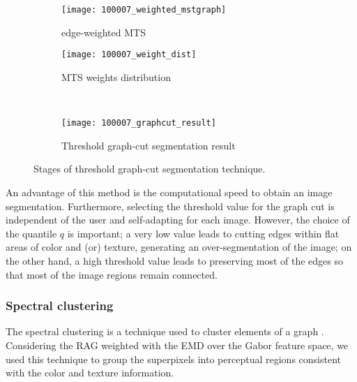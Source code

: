 \begin{figure}[!ht]
    \centering
    \begin{subfigure}[b]{0.49\textwidth}
    	\texttt{[image: 100007\_weighted\_mstgraph]}
    	\caption{edge-weighted MTS} 
    \end{subfigure}      
    \begin{subfigure}[b]{0.49\textwidth}
        \texttt{[image: 100007\_weight\_dist]}
        \caption{MTS weights distribution}
    \end{subfigure}\\ [1ex]
    \begin{subfigure}[b]{0.49\textwidth}
        \texttt{[image: 100007\_graphcut\_result]}
        \caption{Threshold graph-cut segmentation result}
        \label{fig:graphcut_segmentation_result}
    \end{subfigure}    
    
	\caption{Stages of threshold graph-cut segmentation technique.}\label{fig:graphcut_segmentation_technique}    
\end{figure}

An advantage of this method is the computational speed to obtain an image segmentation. Furthermore, selecting the threshold value for the graph cut is independent of the user and self-adapting for each image. However, the choice of the quantile $q$ is important; a very low value leads to cutting edges within flat areas of color and (or) texture, generating an over-segmentation of the image; on the other hand, a high threshold value leads to preserving most of the edges so that most of the image regions remain connected.

\subsubsection{Spectral clustering}

The spectral clustering is a technique used to cluster elements of a graph \citep{Ng.Jordan.ea:NIPS:2001}. Considering the RAG weighted with the EMD over the Gabor feature space, we used this technique to group the superpixels into perceptual regions consistent with the color and texture information.

